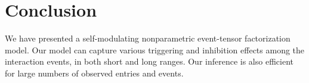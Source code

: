 \vspace{-0.1in}
\section{Conclusion}
\vspace{-0.05in}
We have presented a self-modulating nonparametric event-tensor factorization model. Our model can capture various triggering and inhibition effects among the interaction events, in both short and long ranges. Our inference is also efficient for large numbers of observed entries and events. 